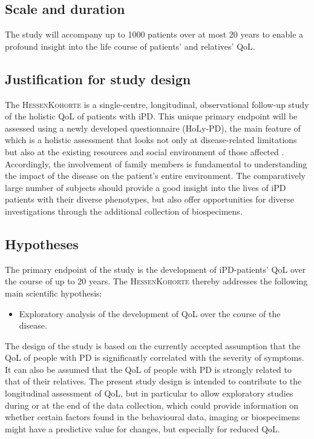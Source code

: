 \subsection{Scale and duration}
The study will accompany up to \num[round-precision = 0, round-mode = places]{1000}{} patients over at most 20 years to enable a profound insight into the life course of patients' and relatives' \ac{QoL}.

\subsection{Justification for study design}
The \textsc{HessenKohorte} is a single-centre, longitudinal, observational follow-up study of the holistic \ac{QoL} of patients with \ac{iPD}. This unique primary endpoint will be assessed using a newly developed questionnaire (\ac{HoLy-PD}), the main feature of which is a holistic assessment that looks not only at disease-related limitations but also at the existing resources and social environment of those affected \cite{thieken2022jpd}. Accordingly, the involvement of family members is fundamental to understanding the impact of the disease on the patient's entire environment. The comparatively large number of subjects should provide a good insight into the lives of \ac{iPD} patients with their diverse phenotypes, but also offer opportunities for diverse investigations through the additional collection of biospecimens.

\subsection{Hypotheses}
\label{sec:hypoTheses}
The primary endpoint of the study is the development of \ac{iPD}-patients' \ac{QoL} over the course of up to 20 years. The \textsc{HessenKohorte} thereby addresses the following main scientific hypothesis:
\begin{itemize}
  \item Exploratory analysis of the development of \acl{QoL} over the course of the disease.
\end{itemize}
The design of the study is based on the currently accepted assumption that the \ac{QoL} of people with PD is significantly correlated with the severity of symptoms. It can also be assumed that the \ac{QoL} of people with PD is strongly related to that of their relatives. The present study design is intended to contribute to the longitudinal assessment of \ac{QoL}, but in particular to allow exploratory studies during or at the end of the data collection, which could provide information on whether certain factors found in the behavioural data, imaging or biospecimens might have a predictive value for changes, but especially for reduced QoL.

